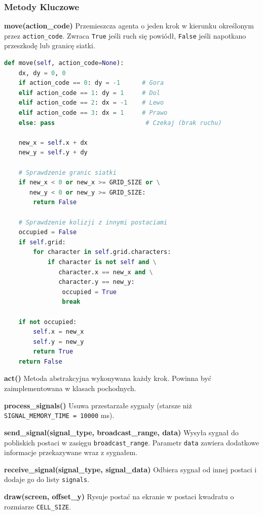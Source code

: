 \documentclass[12pt,a4paper]{article}
\begin{document}
\subsubsection{Metody Kluczowe}

\textbf{move(action\_code)}
Przemieszcza agenta o jeden krok w kierunku określonym przez \texttt{action\_code}. Zwraca \texttt{True} jeśli ruch się powiódł, \texttt{False} jeśli napotkano przeszkodę lub granicę siatki.

\begin{lstlisting}[language=Python]
def move(self, action_code=None):
    dx, dy = 0, 0
    if action_code == 0: dy = -1      # Gora
    elif action_code == 1: dy = 1     # Dol
    elif action_code == 2: dx = -1    # Lewo
    elif action_code == 3: dx = 1     # Prawo
    else: pass                         # Czekaj (brak ruchu)
    
    new_x = self.x + dx
    new_y = self.y + dy
    
    # Sprawdzenie granic siatki
    if new_x < 0 or new_x >= GRID_SIZE or \
       new_y < 0 or new_y >= GRID_SIZE:
        return False
    
    # Sprawdzenie kolizji z innymi postaciami
    occupied = False
    if self.grid:
        for character in self.grid.characters:
            if character is not self and \
               character.x == new_x and \
               character.y == new_y:
                occupied = True
                break
    
    if not occupied:
        self.x = new_x
        self.y = new_y
        return True
    return False
	\end{lstlisting}

\textbf{act()}
Metoda abstrakcyjna wykonywana każdy krok. Powinna być zaimplementowana w klasach pochodnych.

\textbf{process\_signals()}
Usuwa przestarzałe sygnały (starsze niż \texttt{SIGNAL\_MEMORY\_TIME = 10000} ms).

\textbf{send\_signal(signal\_type, broadcast\_range, data)}
Wysyła sygnał do pobliskich postaci w zasięgu \texttt{broadcast\_range}. Parametr \texttt{data} zawiera dodatkowe informacje przekazywane wraz z sygnałem.

\textbf{receive\_signal(signal\_type, signal\_data)}
Odbiera sygnał od innej postaci i dodaje go do listy \texttt{signals}.

\textbf{draw(screen, offset\_y)}
Rysuje postać na ekranie w postaci kwadratu o rozmiarze \texttt{CELL\_SIZE}.
\end{document}
